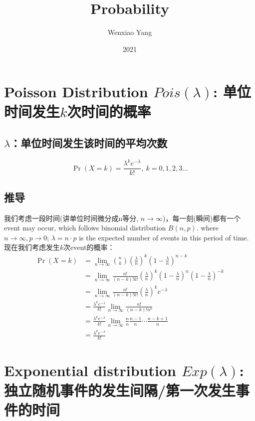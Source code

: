 \documentclass[11pt,a4paper]{article}
\title{Probability}
\author[*]{Wenxiao Yang}
\affil[*]{Department of Mathematics, University of Illinois at Urbana-Champaign}
\date{2021}
\begin{document}
\maketitle
\tableofcontents
\newpage


\section{Poisson Distribution $Pois(\lambda)$: 单位时间发生$k$次时间的概率}
\subsection{$\lambda$：单位时间发生该时间的平均次数}
$$\Pr(X{=}k)= \frac{\lambda^k e^{-\lambda}}{k!},\ k=0,1,2,3...$$
\subsection{推导}
我们考虑一段时间(讲单位时间微分成n等分, $n \rightarrow \infty$)，每一刻(瞬间)都有一个event may occur, which follows binomial distribution $B(n,p)$. where $n \rightarrow \infty, p \rightarrow 0$; $\lambda=n\cdot p$ is the expected number of events in this period of time.\\
现在我们考虑发生$k$次event的概率：
\begin{equation}
    \begin{aligned}
        \Pr(X=k)&=\lim_{n \rightarrow\infty} \binom{n}{k} (\frac{\lambda}{n})^k(1-\frac{\lambda}{n})^{n-k}\\
        &=\lim_{n \rightarrow\infty} \frac{n!}{(n-k)!k!} (\frac{\lambda}{n})^k(1-\frac{\lambda}{n})^{n}(1-\frac{\lambda}{n})^{-k}\\
        &=\lim_{n \rightarrow\infty}\frac{n!}{(n-k)!k!} (\frac{\lambda}{n})^k e^{-\lambda}\\
        &=\frac{\lambda^k e^{-\lambda}}{k!}\lim_{n \rightarrow\infty}\frac{n!}{(n-k)!n^k}\\
        &=\frac{\lambda^k e^{-\lambda}}{k!}\lim_{n \rightarrow\infty}
        \frac{n}{n}\frac{n-1}{n}\cdots \frac{n-k+1}{n}\\
        &=\frac{\lambda^k e^{-\lambda}}{k!}
    \end{aligned}
    \nonumber
\end{equation}




\section{Exponential distribution $Exp(\lambda)$: 独立随机事件的发生间隔/第一次发生事件的时间}
\end{document}
